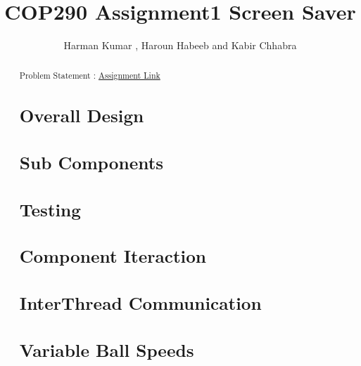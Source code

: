\documentclass[12pt]{article}
\begin{document}
\title{COP290 Assignment1 Screen Saver}
\author{Harman Kumar , Haroun Habeeb and Kabir Chhabra}
\maketitle

\begin{abstract}
\begin{flushleft}
Problem Statement : \href{http://www.cse.iitd.ac.in/~prathmesh/ta/COP290/ass1.html}{Assignment Link} \par



\section{Overall Design}
\section{Sub Components}
\section{Testing}
\section{Component Iteraction}
\section{InterThread Communication}
\section{Variable Ball Speeds}
\end{flushleft}
\end{abstract}
\end{document}
